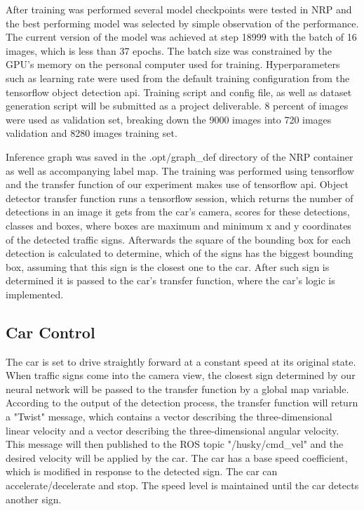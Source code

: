 After training was performed several model checkpoints were tested in NRP and the best performing model was selected by simple observation of the performance. The current version of the model was achieved at step 18999 with the batch of 16 images, which is less than 37 epochs. The batch size was constrained by the GPU's memory on the personal computer used for training. Hyperparameters such as learning rate were used from the default training configuration from the tensorflow object detection api. Training script and config file, as well as dataset generation script will be submitted as a project deliverable. 8 percent of images were used as validation set, breaking down the 9000 images into 720 images validation and 8280 images training set.


Inference graph was saved in the .opt/graph\_def directory of the NRP container as well as accompanying label map. The training was performed using tensorflow and the transfer function of our experiment makes use of tensorflow api. Object detector transfer function runs a tensorflow session, which returns the number of detections in an image it gets from the car's camera, scores for these detections, classes and boxes, where boxes are maximum and minimum x and y coordinates of the detected traffic signs. Afterwards the square of the bounding box for each detection is calculated to determine, which of the signs has the biggest bounding box, assuming that this sign is the closest one to the car. After such sign is determined it is passed to the car's transfer function, where the car's logic is implemented. 

\subsection{Car Control}
The car is set to drive straightly forward at a constant speed at its original state. When traffic signs come into the camera view, the closest sign determined by our neural network will be passed to the transfer function by a global map variable. According to the output of the detection process, the transfer function will return a "Twist" message, which contains a vector describing the three-dimensional linear velocity and a vector describing the three-dimensional angular velocity. This message will then published to the ROS topic "/husky/cmd\_vel" and the desired velocity will be applied by the car. The car has a base speed coefficient, which is modified in response to the detected sign. The car can accelerate/decelerate and stop. The speed level is maintained until the car detects another sign.


